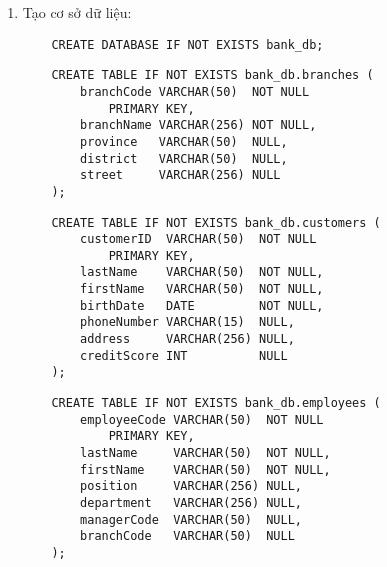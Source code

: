 


\begin{enumerate}[label=\alph*.]

    \item Tạo cơ sở dữ liệu:
    
    \begin{lstlisting}
    CREATE DATABASE IF NOT EXISTS bank_db;
    \end{lstlisting}
    
        
    \begin{lstlisting}
    CREATE TABLE IF NOT EXISTS bank_db.branches (
        branchCode VARCHAR(50)  NOT NULL 
            PRIMARY KEY,
        branchName VARCHAR(256) NOT NULL,
        province   VARCHAR(50)  NULL,
        district   VARCHAR(50)  NULL,
        street     VARCHAR(256) NULL
    );
    \end{lstlisting}

        
    \begin{lstlisting}
    CREATE TABLE IF NOT EXISTS bank_db.customers (
        customerID  VARCHAR(50)  NOT NULL 
            PRIMARY KEY,
        lastName    VARCHAR(50)  NOT NULL,
        firstName   VARCHAR(50)  NOT NULL,
        birthDate   DATE         NOT NULL,
        phoneNumber VARCHAR(15)  NULL,
        address     VARCHAR(256) NULL,
        creditScore INT          NULL
    );
    \end{lstlisting}

    \newpage

        
    \begin{lstlisting}
    CREATE TABLE IF NOT EXISTS bank_db.employees (
        employeeCode VARCHAR(50)  NOT NULL 
            PRIMARY KEY,
        lastName     VARCHAR(50)  NOT NULL,
        firstName    VARCHAR(50)  NOT NULL,
        position     VARCHAR(256) NULL,
        department   VARCHAR(256) NULL,
        managerCode  VARCHAR(50)  NULL,
        branchCode   VARCHAR(50)  NULL
    );
    \end{lstlisting}


\end{enumerate}
